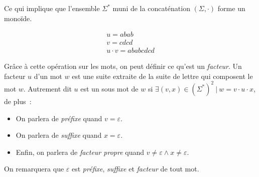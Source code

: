 \noindent Ce qui implique que l'ensemble \(\Sigma ^ *\) muni de la concaténation
\((\Sigma, \cdot)\) forme un monoïde.

\begin{example}
    \begin{gather}
        u = abab \\
        v = cdcd \\
        u \cdot v = ababcdcd
    \end{gather}
\end{example}

Grâce à cette opération sur les mots, on peut définir ce qu'est un
\textit{facteur}. Un facteur \(u\) d’un mot \(w\) est une suite extraite de la
suite de lettre qui composent le mot \(w\). Autrement dit \(u\) est un sous mot
de \(w\) si \(\exists (v, x) \in (\Sigma ^ *)^2 ~|~ w = v \cdot u \cdot x\), de
plus~:

\begin{itemize}[label=\textbullet]
    \item On parlera de \textit{préfixe} quand \(v = \varepsilon\).
    \item On parlera de \textit{suffixe} quand \(x = \varepsilon\).
    \item Enfin, on parlera de \textit{facteur propre} quand \(v \neq \varepsilon \land x
          \neq \varepsilon\).
\end{itemize}

\noindent On remarquera que \(\varepsilon\) est \textit{préfixe}, \textit{suffixe} et
\textit{facteur} de tout mot.